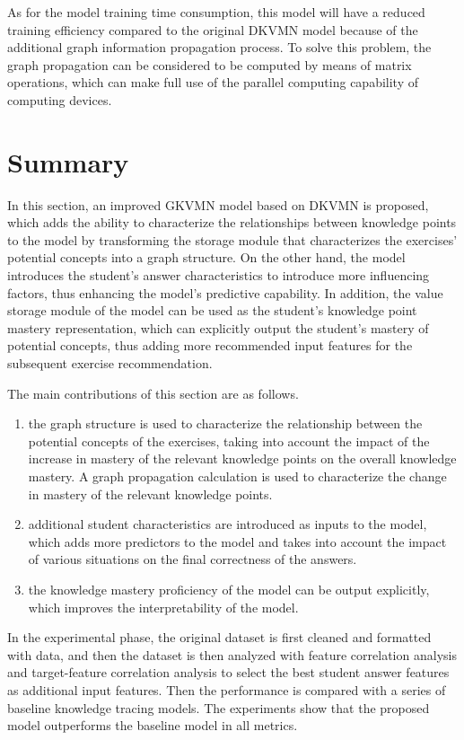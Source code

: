 As for the model training time consumption, this model will have a reduced training efficiency compared to the original DKVMN model because of the additional graph information propagation process. To solve this problem, the graph propagation can be considered to be computed by means of matrix operations, which can make full use of the parallel computing capability of computing devices.
\section{Summary}
In this section, an improved GKVMN model based on DKVMN is proposed, which adds the ability to characterize the relationships between knowledge points to the model by transforming the storage module that characterizes the exercises' potential concepts into a graph structure. On the other hand, the model introduces the student's answer characteristics to introduce more influencing factors, thus enhancing the model's predictive capability. In addition, the value storage module of the model can be used as the student's knowledge point mastery representation, which can explicitly output the student's mastery of potential concepts, thus adding more recommended input features for the subsequent exercise recommendation.

The main contributions of this section are as follows.
\begin{enumerate}
    \item the graph structure is used to characterize the relationship between the potential concepts of the exercises, taking into account the impact of the increase in mastery of the relevant knowledge points on the overall knowledge mastery. A graph propagation calculation is used to characterize the change in mastery of the relevant knowledge points.
    \item additional student characteristics are introduced as inputs to the model, which adds more predictors to the model and takes into account the impact of various situations on the final correctness of the answers.
    \item the knowledge mastery proficiency of the model can be output explicitly, which improves the interpretability of the model.
\end{enumerate}

In the experimental phase, the original dataset is first cleaned and formatted with data, and then the dataset is then analyzed with feature correlation analysis and target-feature correlation analysis to select the best student answer features as additional input features. Then the performance is compared with a series of baseline knowledge tracing models. The experiments show that the proposed model outperforms the baseline model in all metrics.